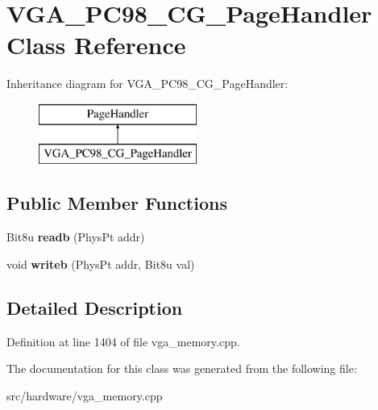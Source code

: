 \hypertarget{classVGA__PC98__CG__PageHandler}{\section{V\-G\-A\-\_\-\-P\-C98\-\_\-\-C\-G\-\_\-\-Page\-Handler Class Reference}
\label{classVGA__PC98__CG__PageHandler}
}
Inheritance diagram for V\-G\-A\-\_\-\-P\-C98\-\_\-\-C\-G\-\_\-\-Page\-Handler\-:\begin{figure}[H]
\begin{center}
\leavevmode
\includegraphics[height=2.000000cm]{classVGA__PC98__CG__PageHandler}
\end{center}
\end{figure}
\subsection*{Public Member Functions}
\begin{DoxyCompactItemize}
\item 
\hypertarget{classVGA__PC98__CG__PageHandler_aaabd662340e0d3602ab7c52643884547}{Bit8u {\bfseries readb} (Phys\-Pt addr)}\label{classVGA__PC98__CG__PageHandler_aaabd662340e0d3602ab7c52643884547}

\item 
\hypertarget{classVGA__PC98__CG__PageHandler_a87860fd23f7204a7f567477dc25d2f6f}{void {\bfseries writeb} (Phys\-Pt addr, Bit8u val)}\label{classVGA__PC98__CG__PageHandler_a87860fd23f7204a7f567477dc25d2f6f}

\end{DoxyCompactItemize}


\subsection{Detailed Description}


Definition at line 1404 of file vga\-\_\-memory.\-cpp.



The documentation for this class was generated from the following file\-:\begin{DoxyCompactItemize}
\item 
src/hardware/vga\-\_\-memory.\-cpp\end{DoxyCompactItemize}
